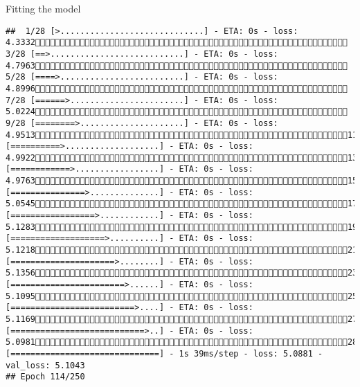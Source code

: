\documentclass[
  ignorenonframetext,
]{beamer}
\begin{document}
\begin{frame}[fragile]{Fitting the model}
\begin{verbatim}
##  1/28 [>.............................] - ETA: 0s - loss: 4.3332 3/28 [==>...........................] - ETA: 0s - loss: 4.7963 5/28 [====>.........................] - ETA: 0s - loss: 4.8996 7/28 [======>.......................] - ETA: 0s - loss: 5.0224 9/28 [========>.....................] - ETA: 0s - loss: 4.951311/28 [==========>...................] - ETA: 0s - loss: 4.992213/28 [============>.................] - ETA: 0s - loss: 4.976315/28 [===============>..............] - ETA: 0s - loss: 5.054517/28 [=================>............] - ETA: 0s - loss: 5.128319/28 [===================>..........] - ETA: 0s - loss: 5.121821/28 [=====================>........] - ETA: 0s - loss: 5.135623/28 [=======================>......] - ETA: 0s - loss: 5.109525/28 [=========================>....] - ETA: 0s - loss: 5.116927/28 [===========================>..] - ETA: 0s - loss: 5.098128/28 [==============================] - 1s 39ms/step - loss: 5.0881 - val_loss: 5.1043
## Epoch 114/250

\end{verbatim}
\end{frame}
\end{document}
